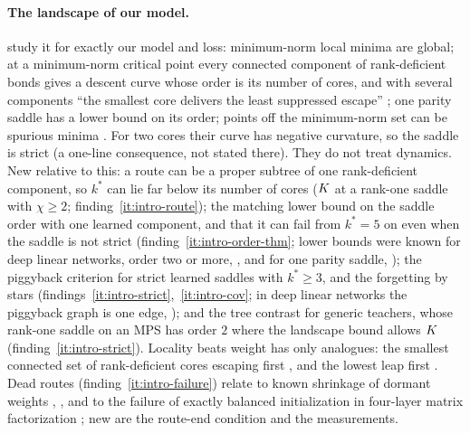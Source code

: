 \paragraph{The landscape of our model.}  study it for exactly our model and
loss: minimum-norm local minima are global; at a minimum-norm critical point every connected component of
rank-deficient bonds gives a descent curve whose order is its number of cores, and with several
components ``the smallest core delivers the least suppressed escape'' \citep[Lemmas~D.8--D.9,
Remark~D.10 and Fig.~4]{furman2026benign}; one parity saddle has a lower bound on its order; points off the
minimum-norm set can be spurious minima \citep[Thm~G.1]{furman2026benign}. For two cores their curve has
negative curvature, so the saddle is strict (a one-line consequence, not stated there). They do not treat
dynamics. New relative to this: a route can be a proper subtree of one rank-deficient component, so $k^*$
can lie far below its number of cores ($K$ at a rank-one saddle with $\chi\ge2$;
finding~\ref{it:intro-route}); the matching lower bound on the saddle order with one learned component,
and that it can fail from $k^*=5$ on even when the saddle is not strict (finding~\ref{it:intro-order-thm}; lower bounds were known for deep linear
networks, order two or more, \citealp[Thm~7]{achour2024loss}, and for one parity saddle,
\citealp[Prop.~5.3]{furman2026benign}); the piggyback criterion for strict learned saddles with
$k^*\ge3$, and the forgetting by stars (findings~\ref{it:intro-strict},~\ref{it:intro-cov}; in deep linear
networks the piggyback graph is one edge, \citealp[Thm~7]{achour2024loss}); and the tree contrast for
generic teachers, whose rank-one saddle on an MPS has order $2$ where the landscape bound allows $K$
(finding~\ref{it:intro-strict}). Locality beats weight has only analogues: the smallest connected set of
rank-deficient cores escaping first \citep[Fig.~4, Remark~D.10]{furman2026benign}, and the lowest leap
first \citep{abbe2023sgd}. Dead routes (finding~\ref{it:intro-failure})
relate to known shrinkage of dormant weights \citep[App.~C.1]{jacot2022saddletosaddle},
\citep{kumar2026learning}, \citep[Lemma~B.1]{kunin2025alternating} and to the failure of exactly
balanced initialization in four-layer matrix factorization \citep{luo2025global}; new are the route-end
condition and the measurements.

